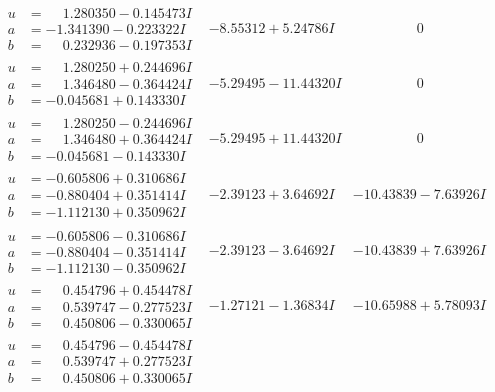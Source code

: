 \documentclass[1p]{elsarticle_modified}
\theoremstyle{definition}
\begin{document}
$$\begin{array}{c|c|c}
\begin{aligned}
u &= \phantom{-}1.280350 - 0.145473 I \\
a &= -1.341390 - 0.223322 I \\
b &= \phantom{-}0.232936 - 0.197353 I\end{aligned}
 & -8.55312 + 5.24786 I & \phantom{-0.000000 } 0 \\ \hline\begin{aligned}
u &= \phantom{-}1.280250 + 0.244696 I \\
a &= \phantom{-}1.346480 - 0.364424 I \\
b &= -0.045681 + 0.143330 I\end{aligned}
 & -5.29495 - 11.44320 I & \phantom{-0.000000 } 0 \\ \hline\begin{aligned}
u &= \phantom{-}1.280250 - 0.244696 I \\
a &= \phantom{-}1.346480 + 0.364424 I \\
b &= -0.045681 - 0.143330 I\end{aligned}
 & -5.29495 + 11.44320 I & \phantom{-0.000000 } 0 \\ \hline\begin{aligned}
u &= -0.605806 + 0.310686 I \\
a &= -0.880404 + 0.351414 I \\
b &= -1.112130 + 0.350962 I\end{aligned}
 & -2.39123 + 3.64692 I & -10.43839 - 7.63926 I \\ \hline\begin{aligned}
u &= -0.605806 - 0.310686 I \\
a &= -0.880404 - 0.351414 I \\
b &= -1.112130 - 0.350962 I\end{aligned}
 & -2.39123 - 3.64692 I & -10.43839 + 7.63926 I \\ \hline\begin{aligned}
u &= \phantom{-}0.454796 + 0.454478 I \\
a &= \phantom{-}0.539747 - 0.277523 I \\
b &= \phantom{-}0.450806 - 0.330065 I\end{aligned}
 & -1.27121 - 1.36834 I & -10.65988 + 5.78093 I \\ \hline\begin{aligned}
u &= \phantom{-}0.454796 - 0.454478 I \\
a &= \phantom{-}0.539747 + 0.277523 I \\
b &= \phantom{-}0.450806 + 0.330065 I\end{aligned}

\end{array}$$
\end{document}
